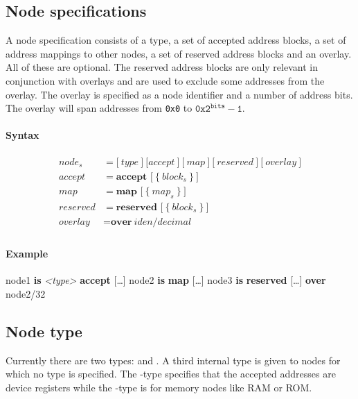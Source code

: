 \documentclass[a4paper,11pt,twoside]{report}
\begin{document}
{{{\subsection{Node specifications}
A node specification consists of a type, a set of accepted address blocks, a set of address mappings to other nodes, a set of reserved address blocks and an overlay.
All of these are optional.
The reserved address blocks are only relevant in conjunction with overlays and are used to exclude some addresses from the overlay.
The overlay is specified as a node identifier and a number of address bits.
The overlay will span addresses from \texttt{0x0} to \(\texttt{0x2}^\texttt{bits} - \texttt{1}\).

\paragraph{Syntax}
\begin{align*}
\textit{node}_s & \mathop{=}
    \Big[\ 
       \textit{type}\ 
    \Big]\  
    \Big[
       \textit{accept}\ 
    \Big]\ 
    \Big[\ 
       \textit{map}\ 
    \Big]\ 
    \Big[\ 
        \textit{reserved}\ 
    \Big]\ 
    \Big[\ 
        \textit{overlay}\ 
    \Big]\\
\textit{accept} & \mathop{=}
    \textbf{accept [}\ \big\{\ \textit{block}_s\ \big\}\ \textbf{]}\\
\textit{map} & \mathop{=}
    \textbf{map [}\ \big\{\ \textit{map}_s\ \big\}\ \textbf{]}\\
\textit{reserved} & \mathop{=}
    \textbf{reserved [}\ \big\{\ \textit{block}_s\ \big\}\ \textbf{]}\\
\textit{overlay} & \mathop{=}
    \textbf{over}\ \textit{iden}\textbf{/}\textit{decimal}\\
\end{align*}

\paragraph{Example}
\begin{syntax}
    node1 \textbf{is} \textit{<type>} \textbf{accept} [\ldots]
    node2 \textbf{is} \textbf{map} [\ldots]
    node3 \textbf{is} \textbf{reserved} [\ldots] \textbf{over} node2/32
\end{syntax}

\subsection{Node type}
Currently there are two types: \Sockeye{device} and \Sockeye{memory}. A third internal type  is given to nodes for which no type is specified.
The \Sockeye{device}-type specifies that the accepted addresses are device registers while the -type is for memory nodes like RAM or ROM.

}}}
\end{document}
